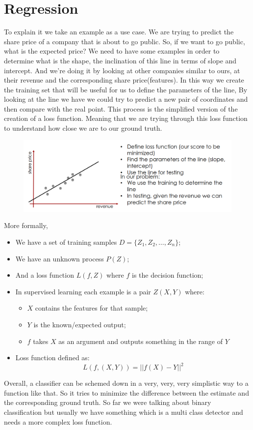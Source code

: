 \section{Regression}
To explain it we take an example as a use case. We are trying to predict the share price of a company that is about to go public.
So, if we want to go public, what is the expected price? We need to have some examples in order to determine what is the shape, the inclination of this line in terms of slope and intercept.
And we're doing it by looking at other companies similar to ours, at their revenue and the corresponding share price(features).
In this way we create the training set that will be useful for us to define the parameters of the line,
By looking at the line we have we could try to predict a new pair of coordinates and then compare with the real point. This process is the simplified version of the creation of a loss function.
Meaning that we are trying through this loss function to understand how close we are to our ground truth.
\begin{figure}[h]
    \centering
    \includegraphics[scale=0.4]{Figures/Regression.png}
\end{figure}
More formally,
\begin{itemize}
    \item We have a set of training samples $D=\{Z_1, Z_2, …, Z_n\}$;
    \item We have an unknown process $P(Z)$;
    \item And a loss function $L(f,Z)$ where $f$ is the decision function;
    \item In supervised learning each example is a pair $Z(X,Y)$ where:
        \begin{itemize}
            \item $X$ contains the features for that sample;
            \item $Y$ is the known/expected output;
            \item $f$ takes $X$ as an argument and outputs something in the range of $Y$
        \end{itemize}
    \item Loss function defined as:\[ L(f, (X,Y))=||f(X)-Y||^2\]
\end{itemize}
Overall, a classifier can be schemed down in a very, very, very simplistic way to a function like that. So it tries to minimize the difference between the estimate and the corresponding ground truth.
So far we were talking about binary classification but usually we have something which is a multi class detector and needs a more complex loss function.

